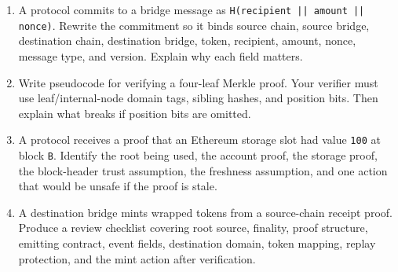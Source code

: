 \begin{enumerate}
\item A protocol commits to a bridge message as \texttt{H(recipient || amount || nonce)}. Rewrite the commitment so it binds source chain, source bridge, destination chain, destination bridge, token, recipient, amount, nonce, message type, and version. Explain why each field matters.

\item Write pseudocode for verifying a four-leaf Merkle proof. Your verifier must use leaf/internal-node domain tags, sibling hashes, and position bits. Then explain what breaks if position bits are omitted.

\item A protocol receives a proof that an Ethereum storage slot had value \texttt{100} at block \texttt{B}. Identify the root being used, the account proof, the storage proof, the block-header trust assumption, the freshness assumption, and one action that would be unsafe if the proof is stale.

\item A destination bridge mints wrapped tokens from a source-chain receipt proof. Produce a review checklist covering root source, finality, proof structure, emitting contract, event fields, destination domain, token mapping, replay protection, and the mint action after verification.
\end{enumerate}
